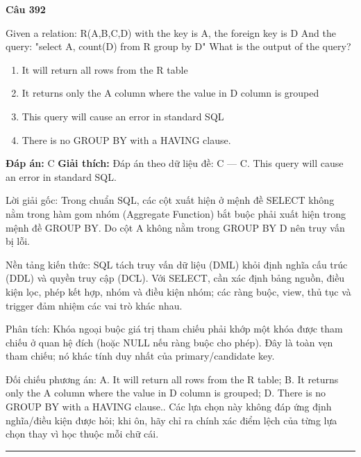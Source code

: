\documentclass[11pt,a4paper]{article}
\newenvironment{question}[1]{%
  \par\vspace{1em}\noindent\textbf{\large Câu #1}\par\vspace{0.4em}
}{%
  \par\vspace{1em}\hrule\vspace{0.6em}
}
\newenvironment{choices}{%
  \begin{enumerate}[label=\textbf{\Alph*.},leftmargin=2.2em,itemsep=2pt,topsep=3pt]
}{%
  \end{enumerate}
}
\newcommand{\choice}{\item}
\begin{document}
\begin{question}{392}
Given a relation: R(A,B,C,D) with the key is A, the foreign key is D And the query: "select A, count(D) from R group by D" What is the output of the query?
\begin{choices}
\choice It will return all rows from the R table
\choice It returns only the A column where the value in D column is grouped
\choice This query will cause an error in standard SQL
\choice There is no GROUP BY with a HAVING clause.
\end{choices}
\textbf{Đáp án:} C
\textbf{Giải thích:} Đáp án theo dữ liệu đề: C — C. This query will cause an error in standard SQL.

Lời giải gốc: Trong chuẩn SQL, các cột xuất hiện ở mệnh đề SELECT không nằm trong hàm gom nhóm (Aggregate Function) bắt buộc phải xuất hiện trong mệnh đề GROUP BY. Do cột A không nằm trong GROUP BY D nên truy vấn bị lỗi.

Nền tảng kiến thức: SQL tách truy vấn dữ liệu (DML) khỏi định nghĩa cấu trúc (DDL) và quyền truy cập (DCL). Với SELECT, cần xác định bảng nguồn, điều kiện lọc, phép kết hợp, nhóm và điều kiện nhóm; các ràng buộc, view, thủ tục và trigger đảm nhiệm các vai trò khác nhau.

Phân tích: Khóa ngoại buộc giá trị tham chiếu phải khớp một khóa được tham chiếu ở quan hệ đích (hoặc NULL nếu ràng buộc cho phép). Đây là toàn vẹn tham chiếu; nó khác tính duy nhất của primary/candidate key.

Đối chiếu phương án: A. It will return all rows from the R table; B. It returns only the A column where the value in D column is grouped; D. There is no GROUP BY with a HAVING clause.. Các lựa chọn này không đáp ứng định nghĩa/điều kiện được hỏi; khi ôn, hãy chỉ ra chính xác điểm lệch của từng lựa chọn thay vì học thuộc mỗi chữ cái.
\end{question}
\end{document}
